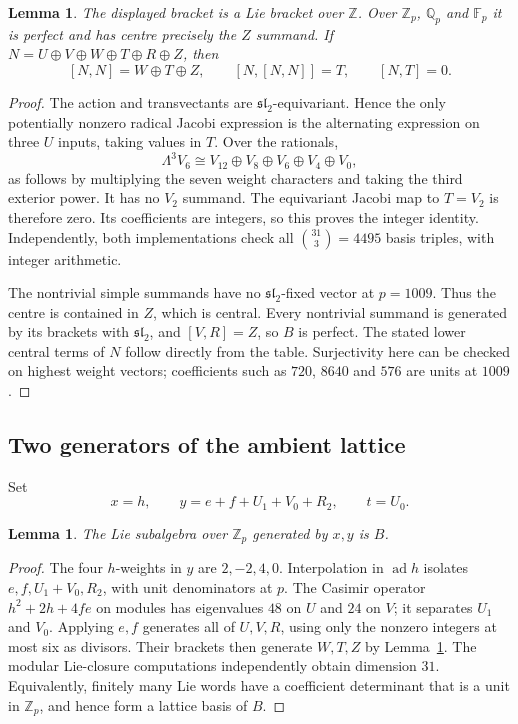 \documentclass[11pt]{article}
\newtheorem{lemma}[theorem]{Lemma}
\theoremstyle{definition}\newtheorem{definition}[theorem]{Definition}
\theoremstyle{remark}\newtheorem{remark}[theorem]{Remark}
\DeclareMathOperator{\ad}{ad}
\newcommand{\Zp}{\mathbb Z_p}
\newcommand{\Qp}{\mathbb Q_p}
\newcommand{\Fp}{\mathbb F_p}
\begin{document}
\begin{lemma}\label{lem:basic}
The displayed bracket is a Lie bracket over $\mathbb Z$. Over $\Zp$, $\Qp$
and $\Fp$ it is perfect and has centre precisely the $Z$ summand. If
$N=U\oplus V\oplus W\oplus T\oplus R\oplus Z$, then
\[
 [N,N]=W\oplus T\oplus Z,\qquad [N,[N,N]]=T,\qquad [N,T]=0.
\]
\end{lemma}
\begin{proof}
The action and transvectants are $\mathfrak{sl}_2$-equivariant. Hence the only
potentially nonzero radical Jacobi expression is the alternating expression
on three $U$ inputs, taking values in $T$. Over the rationals,
\[
 \Lambda^3 V_6\cong V_{12}\oplus V_8\oplus V_6\oplus V_4\oplus V_0,
\]
as follows by multiplying the seven weight characters and taking the third
exterior power. It has no $V_2$ summand. The equivariant Jacobi map to $T=V_2$
is therefore zero. Its coefficients are integers, so this proves the
integer identity. Independently, both implementations check all
$\binom{31}{3}=4495$ basis triples, with integer arithmetic.

The nontrivial simple summands have no $\mathfrak{sl}_2$-fixed vector at
$p=1009$. Thus the centre is contained in $Z$, which is central. Every
nontrivial summand is generated by its brackets with $\mathfrak{sl}_2$, and
$[V,R]=Z$, so $B$ is perfect. The stated lower central terms of $N$ follow
directly from the table. Surjectivity here can be checked on highest weight
vectors; coefficients such as $720$, $8640$ and $576$ are units at $1009$.
\end{proof}

\subsection{Two generators of the ambient lattice}
Set
\begin{equation}\label{eq:xy}
 x=h,\qquad y=e+f+U_1+V_0+R_2,\qquad t=U_0.
\end{equation}
\begin{lemma}\label{lem:generators}
The Lie subalgebra over $\Zp$ generated by $x,y$ is $B$.
\end{lemma}
\begin{proof}
The four $h$-weights in $y$ are $2,-2,4,0$. Interpolation in $\ad h$ isolates
$e,f,U_1+V_0,R_2$, with unit denominators at $p$. The Casimir operator
$h^2+2h+4fe$ on modules has eigenvalues $48$ on $U$ and $24$ on $V$;
it separates $U_1$ and $V_0$. Applying $e,f$ generates all of $U,V,R$,
using only the nonzero integers at most six as divisors. Their brackets
then generate $W,T,Z$ by Lemma~\ref{lem:basic}.
The modular Lie-closure computations independently obtain dimension $31$.
Equivalently, finitely many Lie words have a coefficient determinant that
is a unit in $\Zp$, and hence form a lattice basis of $B$.
\end{proof}
\end{document}
